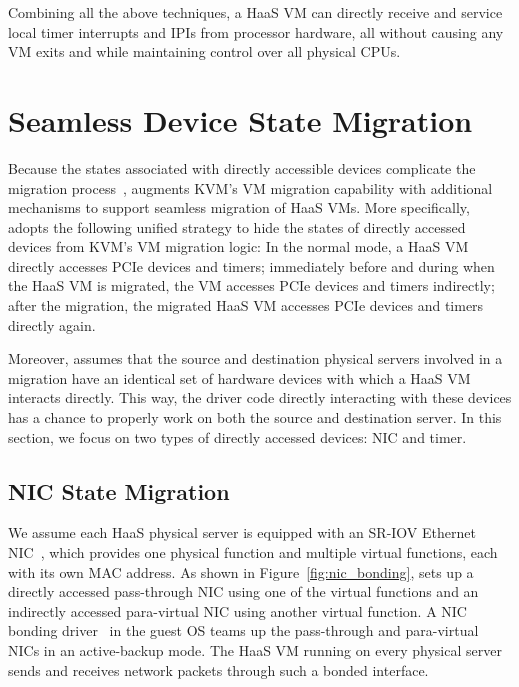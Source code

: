 Combining all the above techniques, a HaaS VM can directly receive  and service
local timer interrupts and IPIs from processor hardware,
all without causing any VM exits and while maintaining control over all physical CPUs.





\vspace{-0.1in}
\section{Seamless Device State Migration}
\vspace{-0.05in}

Because the states associated with directly accessible devices complicate the migration process~\cite{zhai:2008},
\na augments KVM's VM migration capability with additional mechanisms to support seamless migration of HaaS VMs.
More specifically, \na adopts the following unified strategy to hide the states of directly accessed devices from KVM's VM migration logic:
In the normal mode, a HaaS VM directly accesses PCIe devices and timers; immediately before and during when the HaaS VM is migrated,  the VM
accesses PCIe devices and timers indirectly; after the migration, the migrated HaaS VM accesses PCIe devices and timers directly again.

Moreover, \na assumes that the source and destination physical servers involved in a migration have an identical
set of hardware devices with which a HaaS VM interacts directly.
This way, the driver code directly interacting with these devices has a chance to properly work on
both the source and destination server.
In this section, we focus on two types of directly accessed devices: NIC and timer.



\vspace{-0.1in}
\subsection{NIC State Migration}
\label{sec:nic_migration}
\vspace{-0.05in}

We assume each HaaS physical server is equipped with an SR-IOV Ethernet NIC~\cite{dong:2008},
which provides one physical function and multiple virtual functions, each with its own MAC address.
As shown in Figure~\ref{fig:nic_bonding},
\na sets up a directly accessed pass-through NIC using one of the virtual functions
and an indirectly accessed para-virtual NIC using another virtual function.
A NIC bonding driver~\cite{bond-dri} in the guest OS teams up the pass-through and para-virtual NICs in an active-backup mode.
The HaaS VM running on every \na physical server sends and receives network packets through such a bonded interface.

